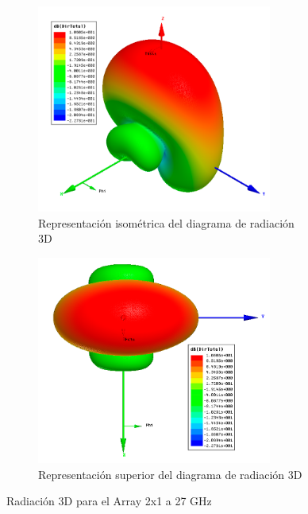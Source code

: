 \begin{figure}[H]
     \centering
     \begin{subfigure}[b]{0.7\textwidth}
         \centering
         \includegraphics[width=0.85\textwidth]{archivos/analisis/2x13/6}
         \caption{Representación isométrica del diagrama de radiación 3D}
         \label{fig:3d12x13}
     \end{subfigure}
     \hfill
     \begin{subfigure}[b]{0.7\textwidth}
         \centering
         \includegraphics[width=0.85\textwidth]{archivos/analisis/2x13/7}
         \caption{Representación superior del diagrama de radiación 3D}
         \label{fig:3d22x13}
     \end{subfigure}
     \hfill
        \caption{Radiación 3D para el Array 2x1 a 27 GHz}
        \label{fig:3d2x13}
\end{figure}

